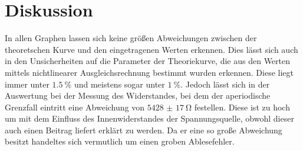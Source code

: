 \section{Diskussion}
\label{sec:Diskussion}

In allen Graphen lassen sich keine größen Abweichungen zwischen der theoretschen Kurve und den eingetragenen Werten erkennen. Dies lässt sich auch in den Unsicherheiten auf die Parameter der Theoriekurve, die aus den Werten mittels nichtlinearer Ausgleichsrechnung bestimmt wurden erkennen. Diese liegt immer unter $\SI{1.5}{\percent}$ und meistens sogar unter $\SI{1}{\percent}$. Jedoch lässt sich in der Auswertung bei der Messung des Widerstandes, bei dem der aperiodische Grenzfall eintritt eine Abweichung von $\SI{5428(17)}{\ohm}$ festellen. Diese ist zu hoch um mit dem Einfluss des Innenwiderstandes der Spannungsquelle, obwohl dieser auch einen Beitrag liefert erklärt zu werden. Da er eine so große Abweichung besitzt handeltes sich vermutlich um einen groben Ablesefehler.







	
